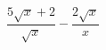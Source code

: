 \begin{ex}[type=calculate_expression]
	\begin{condition}
		\( \dfrac{5\sqrt{x}+2}{\sqrt{x}}-\dfrac{2\sqrt{x}}{x} \)
	\end{condition}
\end{ex}